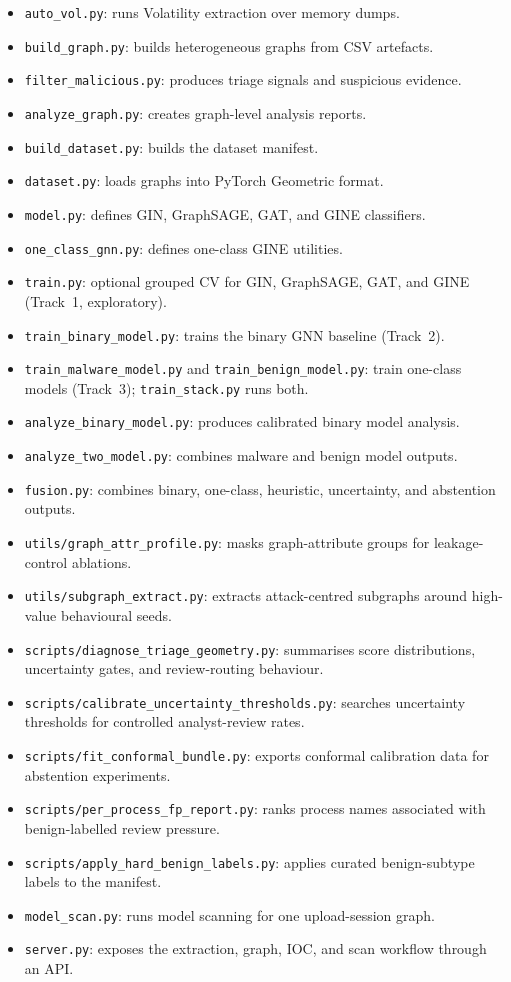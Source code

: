 \begin{itemize}
\item \texttt{auto\_vol.py}: runs Volatility extraction over memory dumps.
\item \texttt{build\_graph.py}: builds heterogeneous graphs from CSV artefacts.
\item \texttt{filter\_malicious.py}: produces triage signals and suspicious evidence.
\item \texttt{analyze\_graph.py}: creates graph-level analysis reports.
\item \texttt{build\_dataset.py}: builds the dataset manifest.
\item \texttt{dataset.py}: loads graphs into PyTorch Geometric format.
\item \texttt{model.py}: defines GIN, GraphSAGE, GAT, and GINE classifiers.
\item \texttt{one\_class\_gnn.py}: defines one-class GINE utilities.
\item \texttt{train.py}: optional grouped CV for GIN, GraphSAGE, GAT, and GINE (Track~1, exploratory).
\item \texttt{train\_binary\_model.py}: trains the binary GNN baseline (Track~2).
\item \texttt{train\_malware\_model.py} and \texttt{train\_benign\_model.py}: train one-class models (Track~3); \texttt{train\_stack.py} runs both.
\item \texttt{analyze\_binary\_model.py}: produces calibrated binary model analysis.
\item \texttt{analyze\_two\_model.py}: combines malware and benign model outputs.
\item \texttt{fusion.py}: combines binary, one-class, heuristic, uncertainty, and abstention outputs.
\item \texttt{utils/graph\_attr\_profile.py}: masks graph-attribute groups for leakage-control ablations.
\item \texttt{utils/subgraph\_extract.py}: extracts attack-centred subgraphs around high-value behavioural seeds.
\item \texttt{scripts/diagnose\_triage\_geometry.py}: summarises score distributions, uncertainty gates, and review-routing behaviour.
\item \texttt{scripts/calibrate\_uncertainty\_thresholds.py}: searches uncertainty thresholds for controlled analyst-review rates.
\item \texttt{scripts/fit\_conformal\_bundle.py}: exports conformal calibration data for abstention experiments.
\item \texttt{scripts/per\_process\_fp\_report.py}: ranks process names associated with benign-labelled review pressure.
\item \texttt{scripts/apply\_hard\_benign\_labels.py}: applies curated benign-subtype labels to the manifest.
\item \texttt{model\_scan.py}: runs model scanning for one upload-session graph.
\item \texttt{server.py}: exposes the extraction, graph, IOC, and scan workflow through an API.
\end{itemize}

